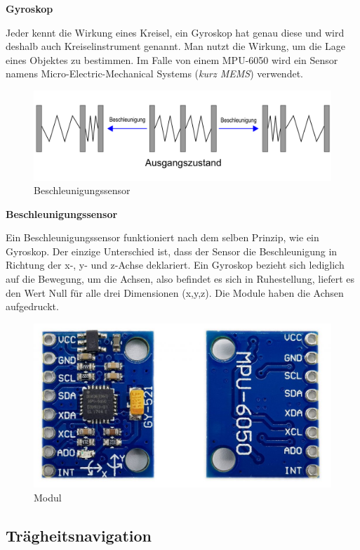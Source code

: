 \textbf{Gyroskop}

Jeder kennt die Wirkung eines Kreisel, ein Gyroskop hat genau diese und wird deshalb auch Kreiselinstrument genannt. Man nutzt die Wirkung, um die Lage eines Objektes zu bestimmen. Im Falle von einem MPU-6050 wird ein Sensor namens Micro-Electric-Mechanical Systems (\emph{kurz MEMS}) verwendet. 


\begin{figure}[H]
	\centering
	\includegraphics[width=0.7\linewidth]{images/Beschleunigungssensor.png}
	\caption[Beschleunigungssensor]{Beschleunigungssensor}
	\label{fig:Beschleunigungssensor}
\end{figure}

\textbf{Beschleunigungssensor}

Ein Beschleunigungssensor funktioniert nach dem selben Prinzip, wie ein Gyroskop. Der einzige Unterschied ist, dass der Sensor die Beschleunigung in Richtung der x-, y- und z-Achse deklariert. Ein Gyroskop bezieht sich lediglich auf die Bewegung, um die Achsen, also befindet es sich in Ruhestellung, liefert es den Wert Null für alle drei Dimensionen (x,y,z). Die Module haben die Achsen aufgedruckt.

\begin{figure}[H]
	\centering
	\includegraphics[width=0.7\linewidth]{images/Modul.jpg}
	\caption[Modul]{Modul}
	\label{fig:Modul}
\end{figure}

\cite{MPU6050}

\subsection{Trägheitsnavigation}

